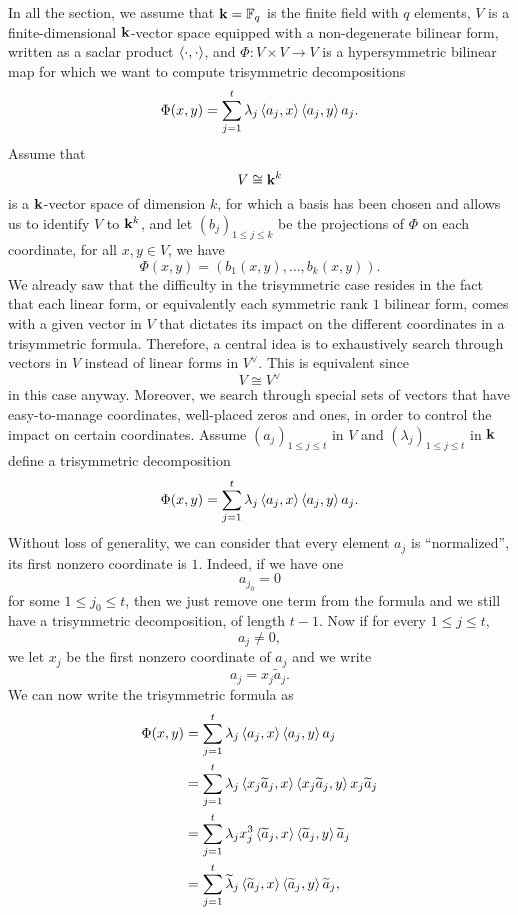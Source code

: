 In all the section, we assume that $\mathbf{k}=\mathbb{F}_q$ is the finite field with
$q$ elements, $V$ is a finite-dimensional $\mathbf{k}$-vector space equipped with a
non-degenerate bilinear form, written as a saclar product $\left\langle\cdot,\cdot\right\rangle$,
and $\Phi:V\times V\to V$ is a hypersymmetric bilinear map for which we want to
compute trisymmetric decompositions
\[
  \Phi(x, y) = \sum_{j=1}^t\lambda_j\left\langle a_j,x\right\rangle\left\langle a_j,y\right\rangle a_j.
\]
Assume that
\[
  V\cong\mathbf{k}^k
\]
is a $\mathbf{k}$-vector space of dimension $k$, for which a basis has been chosen and
allows us to identify $V$ to $\mathbf{k}^k$, and
let $(b_j)_{1\leq j\leq k}$ be the projections of $\Phi$ on each coordinate, \ie for
all $x,y\in V$, we have
\[
  \Phi(x, y) = (b_1(x, y), \dots, b_k(x, y)).
\]
We already saw that the difficulty in the trisymmetric case resides in the
fact that each linear form, or equivalently each symmetric rank $1$ bilinear
form, comes with a given vector in $V$ that dictates its impact on the different
coordinates in a trisymmetric formula. Therefore, a central idea is to
exhaustively search through vectors in $V$ instead of linear forms in $V^\vee$.
This is equivalent since 
\[
  V\cong V^\vee
\]
in this case anyway. Moreover, we search through special sets of vectors that
have easy-to-manage coordinates, \eg well-placed zeros and ones, in order to
control the impact on certain coordinates. Assume $(a_j)_{1\leq j \leq t}$ in $V$ and
$(\lambda_j)_{1\leq j \leq t}$ in $\mathbf{k}$ define a trisymmetric decomposition
\[
  \Phi(x, y) = \sum_{j=1}^t\lambda_j\left\langle a_j,x\right\rangle\left\langle a_j,y\right\rangle a_j.
\]
Without loss of generality, we can consider that every element $a_j$ is
``normalized'', \ie its first nonzero coordinate is $1$. Indeed, if we have one
\[
  a_{j_0} = 0
\]
for some $1\leq j_0 \leq t$, then we just remove one term from the formula and
we still have a trisymmetric decomposition, of length $t-1$. Now if for every
$1\leq j\leq t$, 
\[
  a_j\neq0,
\]
we let $x_j$ be the first nonzero coordinate of $a_j$ and we write
\[
  a_j = x_j \widetilde a_j.
\]
We can now write the trisymmetric formula as
\begin{align*}
  \Phi(x, y) &= \sum_{j=1}^t\lambda_j\left\langle a_j,x\right\rangle\left\langle a_j,y\right\rangle a_j \\
  &= \sum_{j=1}^t\lambda_j\left\langle x_j\widetilde a_j,x\right\rangle\left\langle x_j\widetilde
  a_j,y\right\rangle x_j\widetilde a_j \\
  &= \sum_{j=1}^t\lambda_jx_j^3\left\langle\widetilde a_j,x\right\rangle\left\langle\widetilde
  a_j,y\right\rangle\widetilde a_j \\
  &= \sum_{j=1}^t\widetilde \lambda_j\left\langle\widetilde a_j,x\right\rangle\left\langle\widetilde
  a_j,y\right\rangle\widetilde a_j,
\end{align*}
